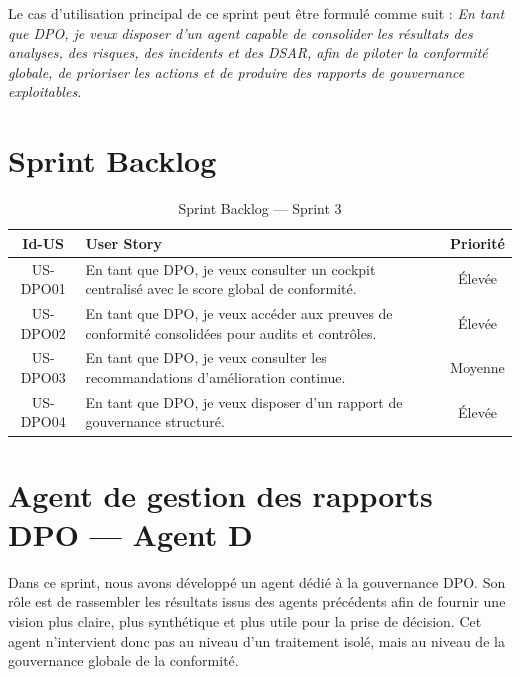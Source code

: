 \documentclass[12pt,a4paper]{report}
\begin{document}
Le cas d'utilisation principal de ce sprint peut être formulé comme suit : \textit{En tant que DPO, je veux disposer d'un agent capable de consolider les résultats des analyses, des risques, des incidents et des DSAR, afin de piloter la conformité globale, de prioriser les actions et de produire des rapports de gouvernance exploitables.}

\section{Sprint Backlog}

\begin{table}[H]
\centering
\caption{Sprint Backlog --- Sprint 3}
\label{tab:backlog_sprint3}
\begin{tabularx}{\textwidth}{|c|X|c|}
\hline
\textbf{Id-US} & \textbf{User Story} & \textbf{Priorité} \\
\hline
US-DPO01 & En tant que DPO, je veux consulter un cockpit centralisé avec le score global de conformité. & Élevée \\
\hline
US-DPO02 & En tant que DPO, je veux accéder aux preuves de conformité consolidées pour audits et contrôles. & Élevée \\
\hline
US-DPO03 & En tant que DPO, je veux consulter les recommandations d'amélioration continue. & Moyenne \\
\hline
US-DPO04 & En tant que DPO, je veux disposer d'un rapport de gouvernance structuré. & Élevée \\
\hline
\end{tabularx}
\end{table}

\section{Agent de gestion des rapports DPO --- Agent D}

Dans ce sprint, nous avons développé un agent dédié à la gouvernance DPO. Son rôle est de rassembler les résultats issus des agents précédents afin de fournir une vision plus claire, plus synthétique et plus utile pour la prise de décision. Cet agent n'intervient donc pas au niveau d'un traitement isolé, mais au niveau de la gouvernance globale de la conformité.
\end{document}
